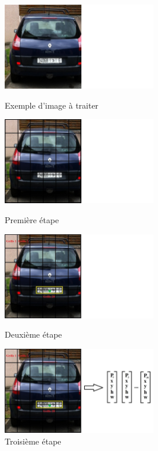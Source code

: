 \begin{frame}
\centering
\begin{figure}
    \begin{overprint}
        \centering\includegraphics[width=0.6\textwidth]{figures/Car.PNG}\caption{Exemple d'image à traiter}
        \centering\includegraphics[width=0.6\textwidth]{figures/Grid.PNG}\caption{Première étape}
        \centering\includegraphics[width=0.6\textwidth]{figures/Center.PNG}\caption{Deuxième étape}
        \centering\includegraphics[width=0.6\textwidth]{figures/YOLO.PNG}\caption{Troisième étape}
    \end{overprint}
\end{figure}
\end{frame}

